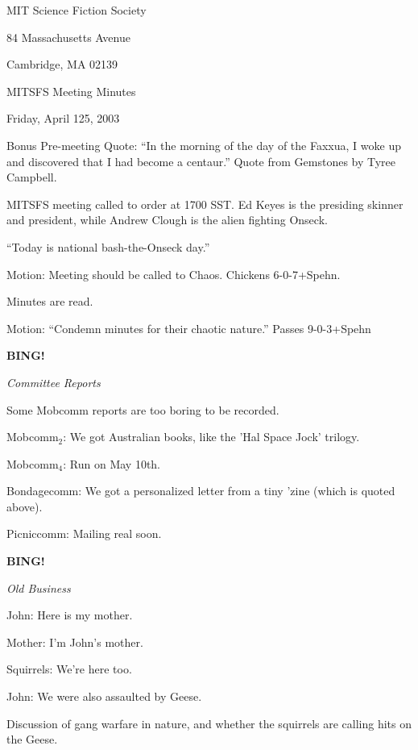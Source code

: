 \documentclass[12pt]{article}
\newcommand{\bing}{{\bf BING!} }
\newcommand{\goto}[1]{\bing \vskip 12pt \centerline{{\em{#1}}}}
\begin{document}
\begin{center}

MIT Science Fiction Society 

84 Massachusetts Avenue

Cambridge, MA 02139

\vspace{12pt}

MITSFS Meeting Minutes 

Friday, April 125, 2003

\end{center}
 
\vspace{18pt}

\setlength{\parskip}{6pt}

\noindent

Bonus Pre-meeting Quote: ``In the morning of the day of the Faxxua, I woke up and discovered that I had become a centaur.''  Quote from Gemstones by Tyree Campbell.

MITSFS meeting called to order at 1700 SST.  Ed Keyes is the presiding skinner and president, while Andrew Clough is the alien fighting Onseck. 

``Today is national bash-the-Onseck day.''

Motion:  Meeting should be called to Chaos.  Chickens 6-0-7+Spehn.

Minutes are read.

Motion:  ``Condemn minutes for their chaotic nature.''  Passes 9-0-3+Spehn

\goto{Committee Reports}

Some Mobcomm reports are too boring to be recorded.

Mobcomm$_2$:  We got Australian books, like the 'Hal Space Jock' trilogy.

Mobcomm$_4$:  Run on May 10th.

Bondagecomm:  We got a personalized letter from a tiny 'zine (which is quoted above).

Picniccomm:  Mailing real soon.

\goto{Old Business}

John:  Here is my mother.

Mother:  I'm John's mother.

Squirrels:  We're here too.

John:  We were also assaulted by Geese.

Discussion of gang warfare in nature, and whether the squirrels are calling hits on the Geese.
\end{document}
